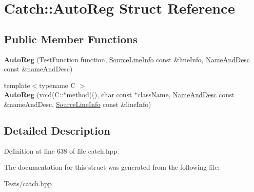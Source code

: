 \hypertarget{struct_catch_1_1_auto_reg}{}\section{Catch\+:\+:Auto\+Reg Struct Reference}
\label{struct_catch_1_1_auto_reg}
\subsection*{Public Member Functions}
\begin{DoxyCompactItemize}
\item 
\mbox{\label{struct_catch_1_1_auto_reg_af224f4568d57b8652474df475a164a8c}} 
{\bfseries Auto\+Reg} (Test\+Function function, \hyperlink{struct_catch_1_1_source_line_info}{Source\+Line\+Info} const \&line\+Info, \hyperlink{struct_catch_1_1_name_and_desc}{Name\+And\+Desc} const \&name\+And\+Desc)
\item 
\mbox{\label{struct_catch_1_1_auto_reg_a1bf9207fe0a02b46dc0ab1cc03cbe738}} 
{\footnotesize template$<$typename C $>$ }\\{\bfseries Auto\+Reg} (void(C\+::$\ast$method)(), char const $\ast$class\+Name, \hyperlink{struct_catch_1_1_name_and_desc}{Name\+And\+Desc} const \&name\+And\+Desc, \hyperlink{struct_catch_1_1_source_line_info}{Source\+Line\+Info} const \&line\+Info)
\end{DoxyCompactItemize}


\subsection{Detailed Description}


Definition at line 638 of file catch.\+hpp.



The documentation for this struct was generated from the following file\+:\begin{DoxyCompactItemize}
\item 
Tests/catch.\+hpp\end{DoxyCompactItemize}

